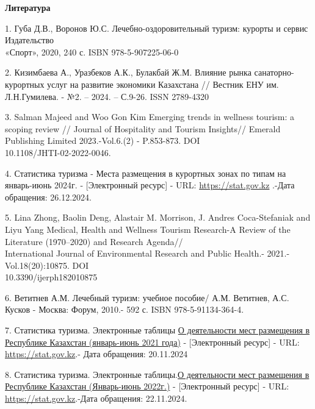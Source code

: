 \begin{center}
{\bfseries Литература}
\end{center}

\begin{references}
1. Губа Д.В., Воронов Ю.С. Лечебно-оздоровительный туризм: курорты и
сервис Издательство \\«Спорт», 2020, 240 с. ISBN 978-5-907225-06-0~

2. Кизимбаева А., Уразбеков А.К., Булакбай Ж.М. Влияние рынка
санаторно-курортных услуг на развитие экономики Казахстана // Вестник
ЕНУ им. Л.Н.Гумилева. - №2. -- 2024. -- С.9-26. ISSN 2789-4320

3. Salman Majeed and Woo Gon Kim Emerging trends in wellness tourism: a
scoping review // Journal of Hospitality and Tourism Insights// Emerald
Publishing Limited 2023.-Vol.6.(2) - P.853-873. DOI\\
10.1108/JHTI-02-2022-0046.

4. Статистика туризма - Места размещения в курортных зонах по типам на
январь-июнь 2024г. - {[}Электронный ресурс{]} - URL:
\href{https://stat.gov.kz/ru/industries/business-statistics/stat-tourism/}{https://stat.gov.kz}
.-Дата обращения: 26.12.2024.

5. Lina Zhong, Baolin Deng, Alastair M. Morrison, J. Andres
Coca-Stefaniak and Liyu Yang Medical, Health and Wellness Tourism
Research-A Review of the Literature (1970--2020) and Research
Agenda//\\International Journal of Environmental Research and Public
Health.- 2021.- Vol.18(20):10875. DOI \\10.3390/ijerph182010875

6. Ветитнев А.М. Лечебный туризм: учебное пособие/ А.М. Ветитнев, А.С.
Кусков - Москва: Форум, 2010.- 592 с. ISBN 978-5-91134-364-4.

7. Статистика туризма. Электронные таблицы
\href{https://stat.gov.kz/api/iblock/element/26608/file/ru/}{О
деятельности мест размещения в Республике Казахстан (январь-июнь 2021
года)} - {[}Электронный ресурс{]} - URL:
\href{https://stat.gov.kz/ru/industries/business-statistics/stat-tourism/spreadsheets/?year=2021&name}{https://stat.gov.kz}.-
Дата обращения: 20.11.2024

8. Статистика туризма. Электронные
таблицы.\href{https://stat.gov.kz/api/iblock/element/4430/file/ru/}{О
деятельности мест размещения в Республике Казахстан (Январь-июнь
2022г.)} - {[}Электронный ресурс{]} - URL:
\href{https://stat.gov.kz/ru/industries/business-statistics/stat-ourism/spreadsheets/?year=2022&name}{https://stat.gov.kz}.-Дата
обращения: 22.11.2024.


\end{references}
